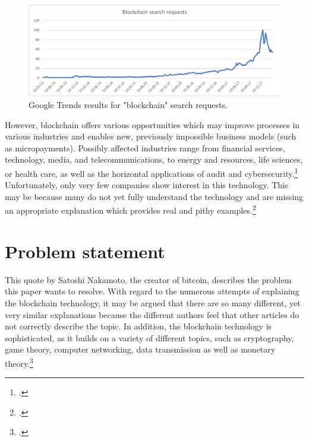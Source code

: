 \begin{figure}
    \centering
    \includegraphics[width=\textwidth]{latex-vorlage_v1.5/graphics/BCRQ.png}
    \caption[Google Trends results for "blockchain" search requests.]{Google Trends results for "blockchain" search requests.\protect\footnotemark}
    \label{fig:SearchRequests}
\end{figure}

However, blockchain offers various opportunities which may improve processes in various industries and enables new, previously impossible business models (such as micropayments). Possibly affected industries range from financial services, technology, media, and telecommunications, to energy and resources, life sciences, or health care, as well as the horizontal applications of audit and cybersecurity.\footcite[Cf.][]{SchatskybitcoinBlockchaincoming2015} Unfortunately, only very few companies show interest in this technology. This may be because many do not yet fully understand the technology and are missing an appropriate explanation which provides real and pithy examples.\footcite[Cf.][P88]{BjoernPaulewicz_Interview}



\section{Problem statement} \label{sec:Problem}

This quote by Satoshi Nakamoto, the creator of bitcoin, describes the problem this paper wants to resolve. 
With regard to the numerous attempts of explaining the blockchain technology, it may be argued that there are so many different, yet very similar explanations because the different authors feel that other articles do not correctly describe the topic. In addition, the blockchain technology is sophisticated, as it builds on a variety of different topics, such as cryptography, game theory, computer networking, data transmission as well as monetary theory.\footcite[Cf.][]{LoppNobodyUnderstandsBitcoin2017} 

